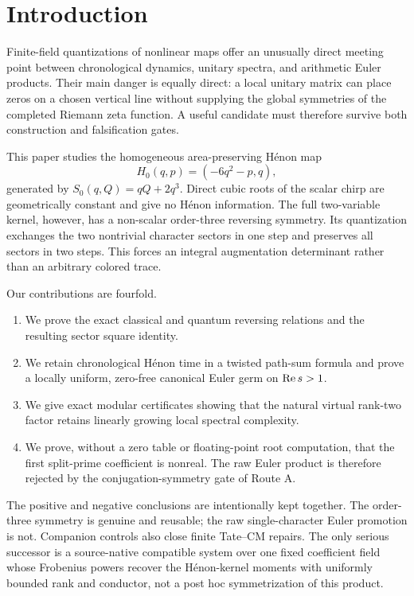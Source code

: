 \section{Introduction}

Finite-field quantizations of nonlinear maps offer an unusually direct
meeting point between chronological dynamics, unitary spectra, and arithmetic
Euler products.  Their main danger is equally direct: a local unitary matrix
can place zeros on a chosen vertical line without supplying the global
symmetries of the completed Riemann zeta function.  A useful candidate must
therefore survive both construction and falsification gates.

This paper studies the homogeneous area-preserving H\'enon map
\[
H_0(q,p)=(-6q^2-p,q),
\]
generated by $S_0(q,Q)=qQ+2q^3$.  Direct cubic roots of the scalar chirp are
geometrically constant and give no H\'enon information.  The full
two-variable kernel, however, has a non-scalar order-three reversing
symmetry.  Its quantization exchanges the two nontrivial character sectors
in one step and preserves all sectors in two steps.  This forces an integral
augmentation determinant rather than an arbitrary colored trace.

Our contributions are fourfold.
\begin{enumerate}
\item We prove the exact classical and quantum reversing relations and the
      resulting sector square identity.
\item We retain chronological H\'enon time in a twisted path-sum formula and
      prove a locally uniform, zero-free canonical Euler germ on
      $\operatorname{Re} s>1$.
\item We give exact modular certificates showing that the natural virtual
      rank-two factor retains linearly growing local spectral complexity.
\item We prove, without a zero table or floating-point root computation, that
      the first split-prime coefficient is nonreal.  The raw Euler product is
      therefore rejected by the conjugation-symmetry gate of Route A.
\end{enumerate}

The positive and negative conclusions are intentionally kept together.  The
order-three symmetry is genuine and reusable; the raw single-character Euler
promotion is not.  Companion controls also close finite Tate--CM repairs.
The only serious successor is a source-native compatible system over one
fixed coefficient field whose Frobenius powers recover the Hénon-kernel
moments with uniformly bounded rank and conductor, not a post hoc
symmetrization of this product.
